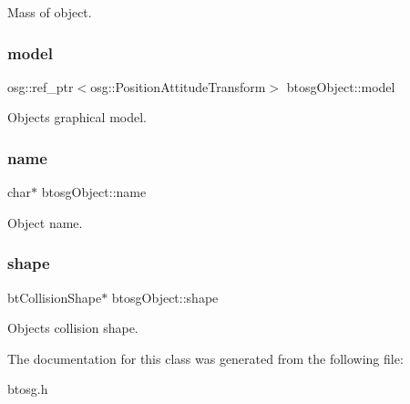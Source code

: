 Mass of object. 

\mbox{\label{classbtosgObject_afd15726e7a214212d6d5815f8ac1ac6c}} 
\subsubsection{\texorpdfstring{model}{model}}
{\footnotesize\ttfamily osg\+::ref\+\_\+ptr$<$osg\+::\+Position\+Attitude\+Transform$>$ btosg\+Object\+::model\hspace{0.3cm}{\ttfamily [inherited]}}



Object\textquotesingle{}s graphical model. 

\mbox{\label{classbtosgObject_a12396e1362797a75473a2e833b579cc9}} 
\subsubsection{\texorpdfstring{name}{name}}
{\footnotesize\ttfamily char$\ast$ btosg\+Object\+::name\hspace{0.3cm}{\ttfamily [inherited]}}



Object name. 

\mbox{\label{classbtosgObject_a0f6a8da01cf643c321bffe86e42604b0}} 
\subsubsection{\texorpdfstring{shape}{shape}}
{\footnotesize\ttfamily bt\+Collision\+Shape$\ast$ btosg\+Object\+::shape\hspace{0.3cm}{\ttfamily [inherited]}}



Object\textquotesingle{}s collision shape. 



The documentation for this class was generated from the following file\+:\begin{DoxyCompactItemize}
\item 
btosg.\+h\end{DoxyCompactItemize}

